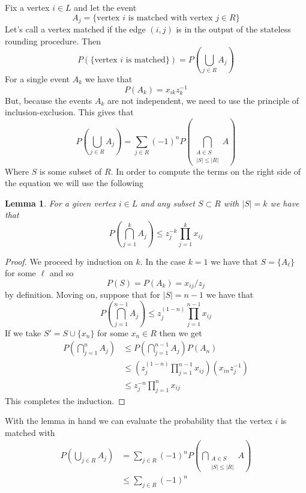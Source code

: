 \documentclass{article}
\newcommand{\problem}[1]{\noindent {\bf #1}}
\newcommand{\problempart}[1]{\noindent{\textbf{(#1)}}}
\newtheorem*{lem}{Lemma}
\begin{document}
\problem{Problem 4.} 
\problempart{a} Fix a vertex $i \in L$ and let the event
\[
A_j = \{\text{vertex } i \text{ is matched with vertex } j \in R\}
\] 
Let's call a vertex matched if the edge $(i,j)$ is in the output of the stateless rounding procedure. Then 
\[
P(\{\text{vertex } i \text{ is matched}\}) = P( \bigcup_{j\in R} A_j )
\]
For a single event $A_k$ we have that 
\[
P(A_k) = x_{ik}z_k^{-1}
\]
But, because the events $A_k$ are not independent, we need to use the principle of inclusion-exclusion. This gives that
\[
P( \bigcup_{j\in R} A_j ) = \sum_{j \in R} (-1)^nP(\bigcap_{\substack{A \in S \\ |S| \leq |R| }}A)
\]
Where $S$ is some subset of $R$. In order to compute the terms on the right side of the equation we will use the following \\
\begin{lem}
For a given vertex $i \in L$ and any subset $S \subset R$ with $|S| = k$ we have that 
\[
P(\bigcap_{j=1}^k A_j) \leq z_j^{-k}\prod_{j=1}^k x_{ij}
\]
\end{lem}
\begin{proof}
We proceed by induction on $k$. In the case $k=1$ we have that $S = \{A_\ell\}$ for some $\ell$ and so 
\[
P(S) = P(A_k) = x_{ij}/z_j 
\]
by definition. Moving on, suppose that for $|S| = n-1$ we have that 
\[
P(\bigcap_{j=1}^{n-1} A_j) \leq z_j^{(1-n)} \prod_{j=1}^{n-1}x_{ij}
\] 
If we take $S' = S \cup \{x_n\}$ for some $x_n \in R$ then we get
\begin{align*}
P(\bigcap_{j=1}^{n} A_j) &\leq P(\bigcap_{j=1}^{n-1} A_j)P(A_n) \\
&\leq \left(z_j^{(1-n)} \prod_{j=1}^{n-1}x_{ij}\right)(x_{in}z_j^{-1}) \\
&\leq z_j^{-n}\prod_{j=1}^n x_{ij}
\end{align*}
This completes the induction.
\end{proof}
With the lemma in hand we can evaluate the probability that the vertex $i$ is matched with 
\begin{align*}
P( \bigcup_{j\in R} A_j ) &= \sum_{j \in R} (-1)^nP(\bigcap_{\substack{A \in S \\ |S| \leq |R| }}A) \\
&\leq \sum_{j \in R} (-1)^n 
\end{align*}
\end{document}
